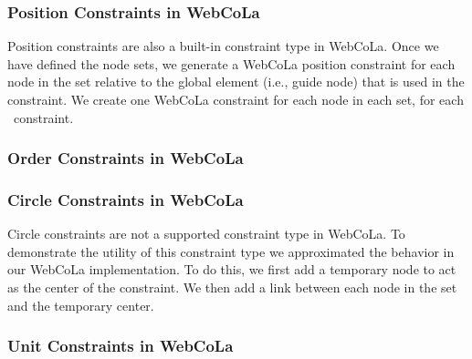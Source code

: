 
\subsubsection{Position Constraints in WebCoLa}
Position constraints are also a built-in constraint type in WebCoLa.
Once we have defined the node sets, we generate a WebCoLa position constraint
for each node in the set relative to the global element (i.e., guide node)
that is used in the constraint. We create one WebCoLa constraint for each node
in each set, for each \projectname\ constraint.


\subsubsection{Order Constraints in WebCoLa}

\subsubsection{Circle Constraints in WebCoLa}
Circle constraints are not a supported constraint type in WebCoLa. To 
demonstrate the utility of this constraint type we approximated the behavior
in our WebCoLa implementation. To do this, we first add a temporary node
to act as the center of the constraint. We then add a link between each 
node in the set and the temporary center. 


\subsubsection{Unit Constraints in WebCoLa}

